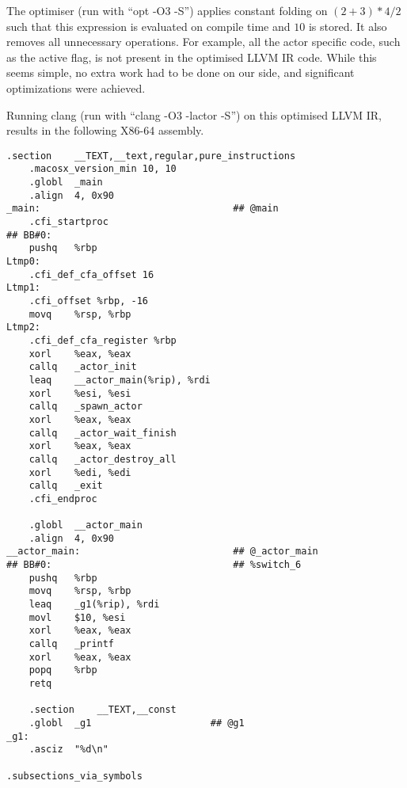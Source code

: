 The optimiser (run with \enquote{opt -O3 -S}) applies constant folding on $(2 + 3 ) * 4 / 2$ such that this expression is evaluated on compile time and $10$ is stored. It also removes all unnecessary operations. For example, all the actor specific code, such as the active flag, is not present in the optimised LLVM IR code. While this seems simple, no extra work had to be done on our side, and significant optimizations were achieved.

Running clang (run with \enquote{clang -O3 -lactor -S}) on this optimised LLVM IR, results in the following X86-64 assembly.

\begin{lstlisting}[style = nasm, breaklines]
	.section	__TEXT,__text,regular,pure_instructions
	.macosx_version_min 10, 10
	.globl	_main
	.align	4, 0x90
_main:                                  ## @main
	.cfi_startproc
## BB#0:
	pushq	%rbp
Ltmp0:
	.cfi_def_cfa_offset 16
Ltmp1:
	.cfi_offset %rbp, -16
	movq	%rsp, %rbp
Ltmp2:
	.cfi_def_cfa_register %rbp
	xorl	%eax, %eax
	callq	_actor_init
	leaq	__actor_main(%rip), %rdi
	xorl	%esi, %esi
	callq	_spawn_actor
	xorl	%eax, %eax
	callq	_actor_wait_finish
	xorl	%eax, %eax
	callq	_actor_destroy_all
	xorl	%edi, %edi
	callq	_exit
	.cfi_endproc

	.globl	__actor_main
	.align	4, 0x90
__actor_main:                           ## @_actor_main
## BB#0:                                ## %switch_6
	pushq	%rbp
	movq	%rsp, %rbp
	leaq	_g1(%rip), %rdi
	movl	$10, %esi
	xorl	%eax, %eax
	callq	_printf
	xorl	%eax, %eax
	popq	%rbp
	retq

	.section	__TEXT,__const
	.globl	_g1                     ## @g1
_g1:
	.asciz	"%d\n"

.subsections_via_symbols
\end{lstlisting}
